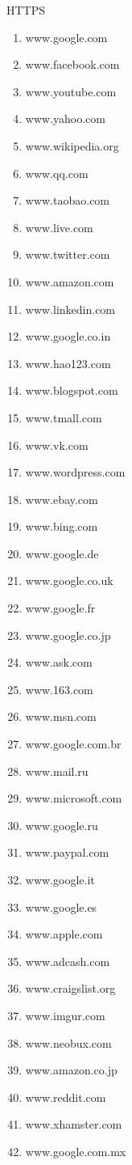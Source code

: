 HTTPS
\begin{enumerate}
\item www.google.com
\item www.facebook.com
\item www.youtube.com
\item www.yahoo.com
\item www.wikipedia.org
\item www.qq.com
\item www.taobao.com
\item www.live.com
\item www.twitter.com
\item www.amazon.com
\item www.linkedin.com
\item www.google.co.in
\item www.hao123.com
\item www.blogspot.com
\item www.tmall.com
\item www.vk.com
\item www.wordpress.com
\item www.ebay.com
\item www.bing.com
\item www.google.de
\item www.google.co.uk
\item www.google.fr
\item www.google.co.jp
\item www.ask.com
\item www.163.com
\item www.msn.com
\item www.google.com.br
\item www.mail.ru
\item www.microsoft.com
\item www.google.ru
\item www.paypal.com
\item www.google.it
\item www.google.es
\item www.apple.com
\item www.adcash.com
\item www.craigslist.org
\item www.imgur.com
\item www.neobux.com
\item www.amazon.co.jp
\item www.reddit.com
\item www.xhamster.com
\item www.google.com.mx

\end{enumerate}
